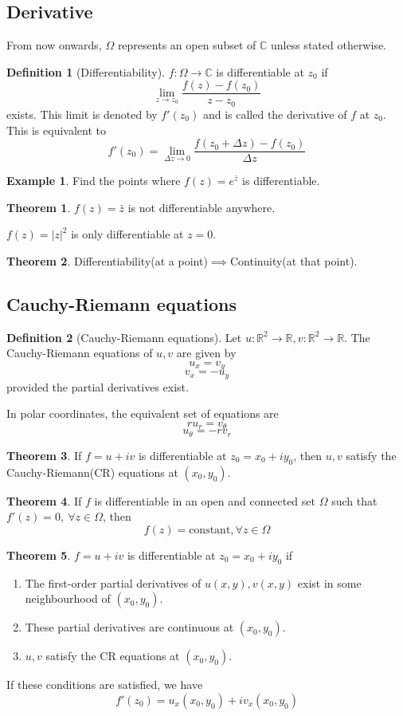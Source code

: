 \documentclass[10pt, a4paper]{extarticle}
\theoremstyle{definition}
\newtheorem{thm}{Theorem}
\newtheorem{defn}{Definition}
\newtheorem{eg}{Example}
\begin{document}
\subsection{Derivative}
From now onwards, $\Omega$ represents an open subset of $\mathbb{C}$ unless stated otherwise.
\begin{defn}[Differentiability]
	$f:\Omega\to\mathbb{C}$ is differentiable at $z_0$ if
	\[\lim_{z\to z_0}\frac{f(z)-f(z_0)}{z-z_0}\]
	exists. This limit is denoted by $f'(z_0)$ and is called the derivative of $f$ at $z_0$. This is equivalent to
	\[f'(z_0)=\lim_{\Delta z\to 0}\frac{f(z_0+\Delta z)-f(z_0)}{\Delta z}\]
\end{defn}
\begin{eg}
	Find the points where $f(z)=e^{\bar z}$ is differentiable.
\end{eg}
\begin{thm}
	$f(z)=\bar{z}$ is not differentiable anywhere.

	$f(z)=|z|^2$ is only differentiable at $z=0$.
\end{thm}
\begin{thm}
	Differentiability(at a point)$\implies$Continuity(at that point).
\end{thm}

\subsection{Cauchy-Riemann equations}
\begin{defn}[Cauchy-Riemann equations]
	Let $u:\mathbb{R}^2\to\mathbb{R},v:\mathbb{R}^2\to\mathbb{R}$. The Cauchy-Riemann equations of $u,v$ are given by
	\[u_x=v_y\]
	\[v_x=-u_y\]
	provided the partial derivatives exist.

	In polar coordinates, the equivalent set of equations are
	\[ru_r=v_\theta\]
	\[u_\theta=-rv_r\]
\end{defn}

\begin{thm}
	If $f=u+iv$ is differentiable at $z_0=x_0+iy_0$, then $u,v$ satisfy the Cauchy-Riemann(CR) equations at $(x_0,y_0)$.
\end{thm}

\begin{thm}
	If $f$ is differentiable in an open and connected set $\Omega$ such that $f'(z)=0,\ \forall z\in\Omega$, then
	\[f(z)=\text{constant}, \forall z\in\Omega\]
\end{thm}

\begin{thm}
	$f=u+iv$ is differentiable at $z_0=x_0+iy_0$ if
	\begin{enumerate}
		\item The first-order partial derivatives of $u(x,y),v(x,y)$ exist in some neighbourhood of $(x_0,y_0)$.
		\item These partial derivatives are continuous at $(x_0,y_0)$.
		\item $u,v$ satisfy the CR equations at $(x_0,y_0)$.
	\end{enumerate}
	If these conditions are satisfied, we have
	\[f'(z_0)=u_x(x_0,y_0)+iv_x(x_0,y_0)\]
\end{thm}
\end{document}
